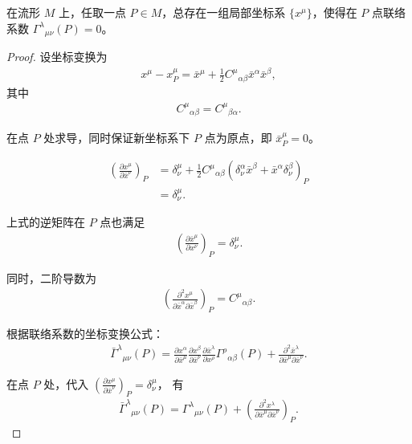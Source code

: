 \begin{theorem}[零联络坐标定理]
在流形 $M$ 上，任取一点 $P \in M$，总存在一组局部坐标系 $\{x^\mu\}$，使得在 $P$ 点联络系数 $\Gamma^{\lambda}{}_{\mu\nu}(P) = 0$。
\end{theorem}
\begin{proof}
设坐标变换为
\begin{align}
x^{\mu} - x^{\mu}_{P} 
= \bar{x}^{\mu} 
+ \frac{1}{2} C^{\mu}{}_{\alpha \beta} \bar{x}^{\alpha} \bar{x}^{\beta},
\end{align}
其中
\begin{align}
C^{\mu}{}_{\alpha \beta} = C^{\mu}{}_{\beta \alpha}.
\end{align}

在点 \( P \) 处求导，同时保证新坐标系下 \( P \) 点为原点，即 \(\bar{x}^{\mu}_{P} = 0\)。

\begin{align}
\left( \frac{\partial x^{\mu}}{\partial \bar{x}^{\nu}} \right)_{P}
&= \delta^{\mu}_{\nu} 
   + \frac{1}{2} C^{\mu}{}_{\alpha \beta}
     \left( \delta^{\alpha}_{\nu} \bar{x}^{\beta}
     + \bar{x}^{\alpha} \delta^{\beta}_{\nu} \right)_{P}
\\
&= \delta^{\mu}_{\nu}.
\end{align}

上式的逆矩阵在 \( P \) 点也满足
\begin{align}
\left( \frac{\partial \bar{x}^{\mu}}{\partial x^{\nu}} \right)_{P}
= \delta^{\mu}_{\nu}.
\end{align}

同时，二阶导数为
\begin{align}
\left( \frac{\partial^{2} x^{\mu}}
           {\partial \bar{x}^{\alpha} \partial \bar{x}^{\beta}} \right)_{P}
= C^{\mu}{}_{\alpha \beta}.
\end{align}

根据联络系数的坐标变换公式：
\begin{align}
\bar{\Gamma}^{\lambda}{}_{\mu \nu}(P)
= \frac{\partial x^{\alpha}}{\partial \bar{x}^{\mu}}
  \frac{\partial x^{\beta}}{\partial \bar{x}^{\nu}}
  \frac{\partial \bar{x}^{\lambda}}{\partial x^{\rho}}
  \Gamma^{\rho}{}_{\alpha \beta}(P)
+ \frac{\partial^{2} \bar{x}^{\lambda}}
       {\partial \bar{x}^{\mu} \partial \bar{x}^{\nu}}.
\end{align}

在点 \( P \) 处，代入
\(\left( \frac{\partial x^{\mu}}{\partial \bar{x}^{\nu}} \right)_{P}
= \delta^{\mu}_{\nu}\)，
有
\begin{align}
\bar{\Gamma}^{\lambda}{}_{\mu \nu}(P)
= \Gamma^{\lambda}{}_{\mu \nu}(P)
  + \left( \frac{\partial^{2} x^{\lambda}}
                {\partial \bar{x}^{\mu} \partial \bar{x}^{\nu}} \right)_{P}.
\end{align}


\end{proof}
